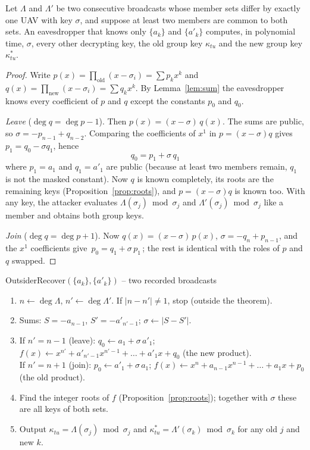 \begin{theorem}\label{thm:outsider}
Let $\Lambda$ and $\Lambda'$ be two consecutive broadcasts whose member sets differ by exactly one UAV with key $\sigma$, and suppose at least two members
are common to both sets. An eavesdropper that knows only $\{a_k\}$ and $\{a'_k\}$ computes, in polynomial time, $\sigma$, every other decrypting key, the
old group key $\kappa_{tu}$ and the new group key $\kappa^*_{tu}$.
\end{theorem}
\begin{proof}
Write $p(x)=\prod_{\text{old}}(x-\sigma_i)=\sum p_kx^k$ and $q(x)=\prod_{\text{new}}(x-\sigma_i)=\sum q_kx^k$. By Lemma~\ref{lem:sum} the eavesdropper
knows every coefficient of $p$ and $q$ except the constants $p_0$ and $q_0$.

\emph{Leave} ($\deg q=\deg p-1$). Then $p(x)=(x-\sigma)\,q(x)$. The sums are public, so $\sigma=-p_{n-1}+q_{n-2}$. Comparing the coefficients of $x^1$
in $p=(x-\sigma)q$ gives $p_1=q_0-\sigma q_1$, hence
\[
\boxed{\;q_0=p_1+\sigma\,q_1\;}
\]
where $p_1=a_1$ and $q_1=a'_1$ are public (because at least two members remain, $q_1$ is not the masked constant). Now $q$ is known completely, its roots
are the remaining keys (Proposition~\ref{prop:roots}), and $p=(x-\sigma)q$ is known too. With any key, the attacker evaluates $\Lambda(\sigma_j)\bmod\sigma_j$
and $\Lambda'(\sigma_j)\bmod\sigma_j$ like a member and obtains both group keys.

\emph{Join} ($\deg q=\deg p+1$). Now $q(x)=(x-\sigma)\,p(x)$, $\sigma=-q_{n}+p_{n-1}$, and the $x^1$ coefficients give
$\boxed{\,p_0=q_1+\sigma\,p_1\,}$; the rest is identical with the roles of $p$ and $q$ swapped.
\end{proof}

\begin{algorithm}{OutsiderRecover$(\{a_k\},\{a'_k\})$ -- two recorded broadcasts}\label{alg:outsider}
\begin{enumerate}[leftmargin=*,label=\arabic*.]
\item $n\leftarrow\deg\Lambda$, \;$n'\leftarrow\deg\Lambda'$. If $|n-n'|\neq1$, stop (outside the theorem).
\item Sums: $S=-a_{n-1}$, \;$S'=-a'_{n'-1}$; \;$\sigma\leftarrow|S-S'|$.
\item If $n'=n-1$ (leave): $q_0\leftarrow a_1+\sigma\,a'_1$; \;$f(x)\leftarrow x^{n'}+a'_{n'-1}x^{n'-1}+\dots+a'_1x+q_0$ (the new product).\\
If $n'=n+1$ (join): $p_0\leftarrow a'_1+\sigma\,a_1$; \;$f(x)\leftarrow x^{n}+a_{n-1}x^{n-1}+\dots+a_1x+p_0$ (the old product).
\item Find the integer roots of $f$ (Proposition~\ref{prop:roots}); together with $\sigma$ these are all keys of both sets.
\item Output $\kappa_{tu}=\Lambda(\sigma_j)\bmod\sigma_j$ and $\kappa^*_{tu}=\Lambda'(\sigma_k)\bmod\sigma_k$ for any old $j$ and new $k$.
\end{enumerate}
\end{algorithm}

